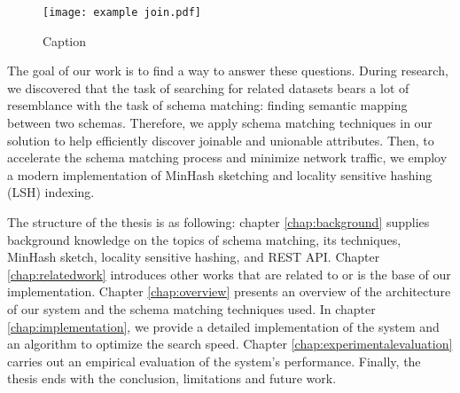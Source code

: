 \begin{figure}
    \centering
    \texttt{[image: example join.pdf]}
    \caption{Caption}
    \label{fig:exampleJoin}
\end{figure}

The goal of our work is to find a way to answer these questions. During research, we discovered that the task of searching for related datasets bears a lot of resemblance with the task of schema matching: finding semantic mapping between two schemas. Therefore, we apply schema matching techniques in our solution to help efficiently discover joinable and unionable attributes. Then, to accelerate the schema matching process and minimize network traffic, we employ a modern implementation of MinHash sketching and locality sensitive hashing (LSH) indexing.

The structure of the thesis is as following: chapter \ref{chap:background} supplies background knowledge on the topics of schema matching, its techniques, MinHash sketch, locality sensitive hashing, and REST API. Chapter \ref{chap:relatedwork} introduces other works that are related to or is the base of our implementation. Chapter \ref{chap:overview} presents an overview of the architecture of our system and the schema matching techniques used. In chapter \ref{chap:implementation}, we provide a detailed implementation of the system and an algorithm to optimize the search speed. Chapter \ref{chap:experimentalevaluation} carries out an empirical evaluation of the system's performance. Finally, the thesis ends with the conclusion, limitations and future work.





